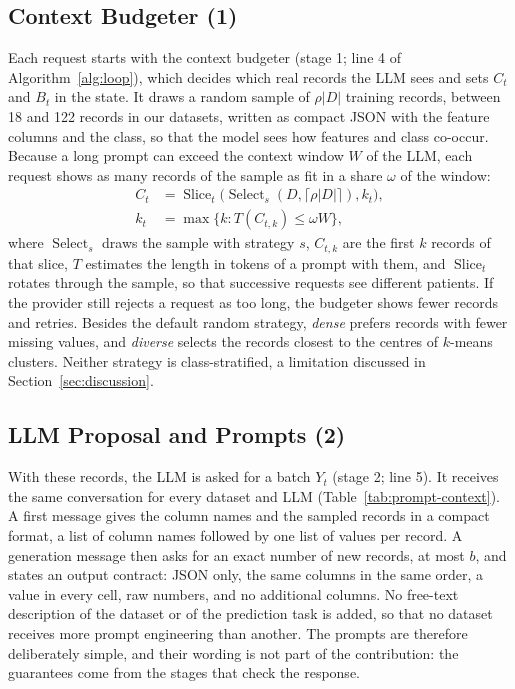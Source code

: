 \documentclass[conference]{IEEEtran}
\begin{document}
\subsection{Context Budgeter (1)}
Each request starts with the context budgeter (stage 1; line 4 of Algorithm~\ref{alg:loop}), which decides which real records the LLM sees and sets $C_t$ and $B_t$ in the state. It draws a random sample of $\rho|D|$ training records, between 18 and 122 records in our datasets, written as compact JSON with the feature columns and the class, so that the model sees how features and class co-occur. Because a long prompt can exceed the context window $W$ of the LLM, each request shows as many records of the sample as fit in a share $\omega$ of the window:
\begin{equation}
\begin{aligned}
C_t&=\operatorname{Slice}_{t}\bigl(\operatorname{Select}_{s}(D,\lceil\rho|D|\rceil),k_t\bigr),\\
k_t&=\max\{k:T(C_{t,k})\leq\omega W\},
\end{aligned}
\label{eq:context}
\end{equation}
where $\operatorname{Select}_s$ draws the sample with strategy $s$, $C_{t,k}$ are the first $k$ records of that slice, $T$ estimates the length in tokens of a prompt with them, and $\operatorname{Slice}_t$ rotates through the sample, so that successive requests see different patients. If the provider still rejects a request as too long, the budgeter shows fewer records and retries. Besides the default random strategy, \emph{dense} prefers records with fewer missing values, and \emph{diverse} selects the records closest to the centres of $k$-means clusters. Neither strategy is class-stratified, a limitation discussed in Section~\ref{sec:discussion}.

\subsection{LLM Proposal and Prompts (2)}
With these records, the LLM is asked for a batch $Y_t$ (stage 2; line 5). It receives the same conversation for every dataset and LLM (Table~\ref{tab:prompt-context}). A first message gives the column names and the sampled records in a compact format, a list of column names followed by one list of values per record. A generation message then asks for an exact number of new records, at most $b$, and states an output contract: JSON only, the same columns in the same order, a value in every cell, raw numbers, and no additional columns. No free-text description of the dataset or of the prediction task is added, so that no dataset receives more prompt engineering than another. The prompts are therefore deliberately simple, and their wording is not part of the contribution: the guarantees come from the stages that check the response.
\end{document}
